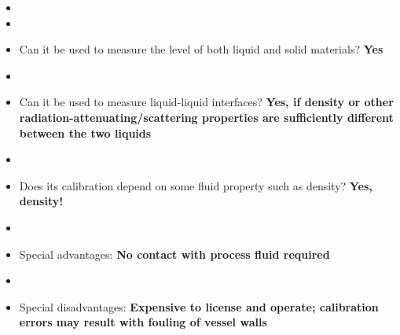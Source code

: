 \vskip 10pt

\begin{itemize}
\goodbreak
\item{} 
\item\item{} Can it be used to measure the level of both liquid and solid materials? {\bf Yes}
\item\item{} Can it be used to measure liquid-liquid interfaces? {\bf Yes, if density or other radiation-attenuating/scattering properties are sufficiently different between the two liquids}
\item\item{} Does its calibration depend on some fluid property such as density? {\bf Yes, density!}
\item\item{} Special advantages: {\bf No contact with process fluid required}
\item\item{} Special disadvantages: {\bf Expensive to license and operate; calibration errors may result with fouling of vessel walls}
\end{itemize}













